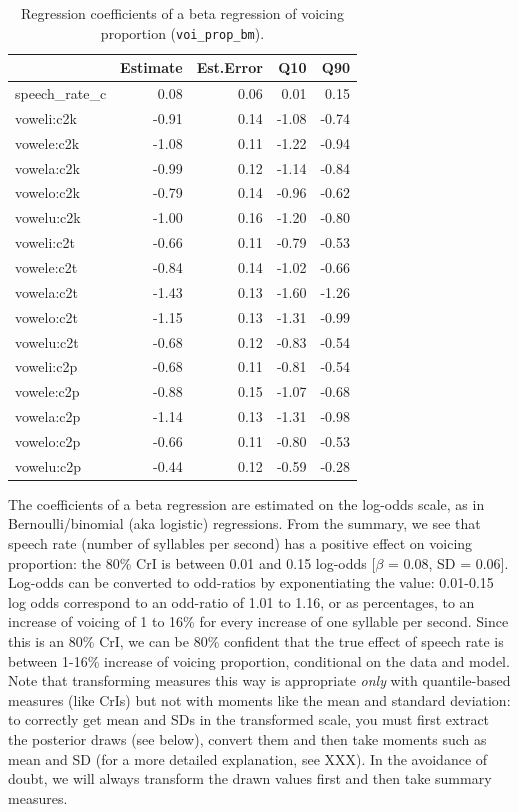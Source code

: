 \documentclass[
  authoryear,
  preprint,
  3p]{elsarticle}
\begin{document}
\begin{longtable}[]{@{}lrrrr@{}}

\caption{\label{tbl-voi-prop-fixef}Regression coefficients of a beta
regression of voicing proportion (\texttt{voi\_prop\_bm}).}

\tabularnewline

\toprule\noalign{}
& Estimate & Est.Error & Q10 & Q90 \\
\midrule\noalign{}
\endhead
\bottomrule\noalign{}
\endlastfoot
speech\_rate\_c & 0.08 & 0.06 & 0.01 & 0.15 \\
voweli:c2k & -0.91 & 0.14 & -1.08 & -0.74 \\
vowele:c2k & -1.08 & 0.11 & -1.22 & -0.94 \\
vowela:c2k & -0.99 & 0.12 & -1.14 & -0.84 \\
vowelo:c2k & -0.79 & 0.14 & -0.96 & -0.62 \\
vowelu:c2k & -1.00 & 0.16 & -1.20 & -0.80 \\
voweli:c2t & -0.66 & 0.11 & -0.79 & -0.53 \\
vowele:c2t & -0.84 & 0.14 & -1.02 & -0.66 \\
vowela:c2t & -1.43 & 0.13 & -1.60 & -1.26 \\
vowelo:c2t & -1.15 & 0.13 & -1.31 & -0.99 \\
vowelu:c2t & -0.68 & 0.12 & -0.83 & -0.54 \\
voweli:c2p & -0.68 & 0.11 & -0.81 & -0.54 \\
vowele:c2p & -0.88 & 0.15 & -1.07 & -0.68 \\
vowela:c2p & -1.14 & 0.13 & -1.31 & -0.98 \\
vowelo:c2p & -0.66 & 0.11 & -0.80 & -0.53 \\
vowelu:c2p & -0.44 & 0.12 & -0.59 & -0.28 \\

\end{longtable}

The coefficients of a beta regression are estimated on the log-odds
scale, as in Bernoulli/binomial (aka logistic) regressions. From the
summary, we see that speech rate (number of syllables per second) has a
positive effect on voicing proportion: the 80\% CrI is between 0.01 and
0.15 log-odds {[}\(\beta\) = 0.08, SD = 0.06{]}. Log-odds can be
converted to odd-ratios by exponentiating the value: 0.01-0.15 log odds
correspond to an odd-ratio of 1.01 to 1.16, or as percentages, to an
increase of voicing of 1 to 16\% for every increase of one syllable per
second. Since this is an 80\% CrI, we can be 80\% confident that the
true effect of speech rate is between 1-16\% increase of voicing
proportion, conditional on the data and model. Note that transforming
measures this way is appropriate \emph{only} with quantile-based
measures (like CrIs) but not with moments like the mean and standard
deviation: to correctly get mean and SDs in the transformed scale, you
must first extract the posterior draws (see below), convert them and
then take moments such as mean and SD (for a more detailed explanation,
see XXX). In the avoidance of doubt, we will always transform the drawn
values first and then take summary measures.
\end{document}
